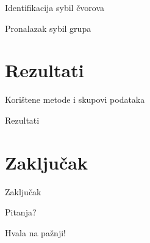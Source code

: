 \documentclass{beamer}
\begin{document}
\begin{frame}{Identifikacija sybil čvorova}
  \begin{itemize}
  \end{itemize}
\end{frame}

\begin{frame}{Pronalazak sybil grupa}
  \begin{itemize}
  \end{itemize}
\end{frame}

\section{Rezultati}

\begin{frame}{Korištene metode i skupovi podataka}
  \begin{itemize}
  \end{itemize}
\end{frame}

\begin{frame}{Rezultati}
  \begin{itemize}
  \end{itemize}
\end{frame}

\section{Zaključak}

\begin{frame}{Zaključak}
  \begin{itemize}
  \end{itemize}
\end{frame}

\begin{frame}[standout]
  \Huge{\centerline{Pitanja?}}
\end{frame}

\begin{frame}[standout]
  \Huge{\centerline{Hvala na pažnji!}}
\end{frame}
\end{document}
